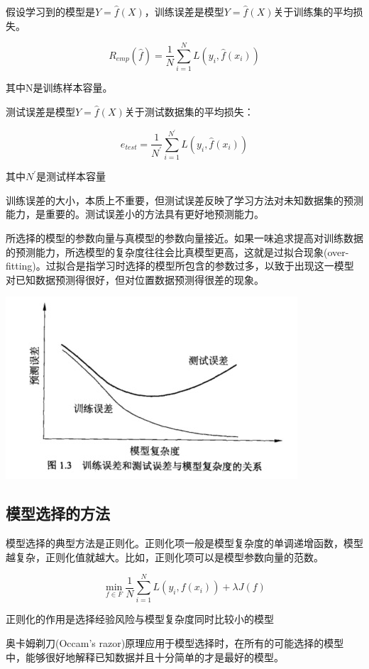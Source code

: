 \documentclass{ctexart}
\begin{document}
	假设学习到的模型是\(Y = \hat{f}(X)\)，训练误差是模型\(Y = \hat{f}(X)\)关于训练集的平均损失。
	
	\[R_{emp}(\hat{f}) = \frac{1}{N}\sum_{i=1}^{N}L(y_i, \hat{f}(x_i))\]
	
	其中N是训练样本容量。
	
	测试误差是模型\(Y = \hat{f}(X)\)关于测试数据集的平均损失：
	
	\[e_{test} = \frac{1}{N^{'}}\sum_{i=1}^{N^{'}}L(y_i, \hat{f}(x_i))\]
	
	其中\(N^{'}\)是测试样本容量
	
	训练误差的大小，本质上不重要，但测试误差反映了学习方法对未知数据集的预测能力，是重要的。测试误差小的方法具有更好地预测能力。
	
	所选择的模型的参数向量与真模型的参数向量接近。如果一味追求提高对训练数据的预测能力，所选模型的复杂度往往会比真模型更高，这就是过拟合现象(over-fitting)。过拟合是指学习时选择的模型所包含的参数过多，以致于出现这一模型对已知数据预测得很好，但对位置数据预测得很差的现象。
	
	\begin{center}
	\includegraphics[width=0.8\linewidth]{pic/training_error_and_testing_error}
	\end{center}

	\subsection{模型选择的方法}
	
	模型选择的典型方法是正则化。正则化项一般是模型复杂度的单调递增函数，模型越复杂，正则化值就越大。比如，正则化项可以是模型参数向量的范数。
	
	\[\min_{f \in F}  \frac{1}{N} \sum_{i=1}^{N}L(y_i, f(x_i)) + \lambda J(f)\]
	
	正则化的作用是选择经验风险与模型复杂度同时比较小的模型
	
	奥卡姆剃刀(Occam's razor)原理应用于模型选择时，在所有的可能选择的模型中，能够很好地解释已知数据并且十分简单的才是最好的模型。
	
\end{document}
